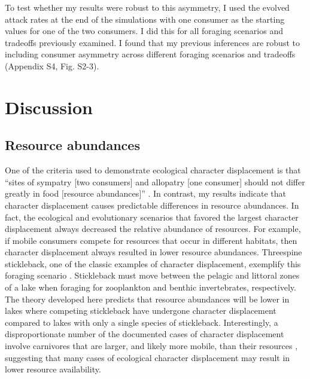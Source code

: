 \documentclass[11pt,]{article}
\begin{document}
To test whether my results were robust to this asymmetry, I used the
evolved attack rates at the end of the simulations with one consumer as
the starting values for one of the two consumers. I did this for all
foraging scenarios and tradeoffs previously examined. I found that my
previous inferences are robust to including consumer asymmetry across
different foraging scenarios and tradeoffs (Appendix S4, Fig. S2-3).

\section{Discussion}\label{discussion}

\subsection{Resource abundances}\label{resource-abundances}

One of the criteria used to demonstrate ecological character
displacement is that ``sites of sympatry {[}two consumers{]} and
allopatry {[}one consumer{]} should not differ greatly in food
\(\textbf{[}\)resource abundances\(\textbf{]}\)'' \citep{Schluter1992}.
In contrast, my results indicate that character displacement causes
predictable differences in resource abundances. In fact, the ecological
and evolutionary scenarios that favored the largest character
displacement always decreased the relative abundance of resources. For
example, if mobile consumers compete for resources that occur in
different habitats, then character displacement always resulted in lower
resource abundances. Threespine stickleback, one of the classic examples
of character displacement, exemplify this foraging scenario
\citep{Schluter1992, Schluter2000}. Stickleback must move between the
pelagic and littoral zones of a lake when foraging for zooplankton and
benthic invertebrates, respectively. The theory developed here predicts
that resource abundances will be lower in lakes where competing
stickleback have undergone character displacement compared to lakes with
only a single species of stickleback. Interestingly, a disproportionate
number of the documented cases of character displacement involve
carnivores \citep{Schluter2000} that are larger, and likely more mobile,
than their resources \citep{McCann2005}, suggesting that many cases of
ecological character displacement may result in lower resource
availability.
\end{document}

